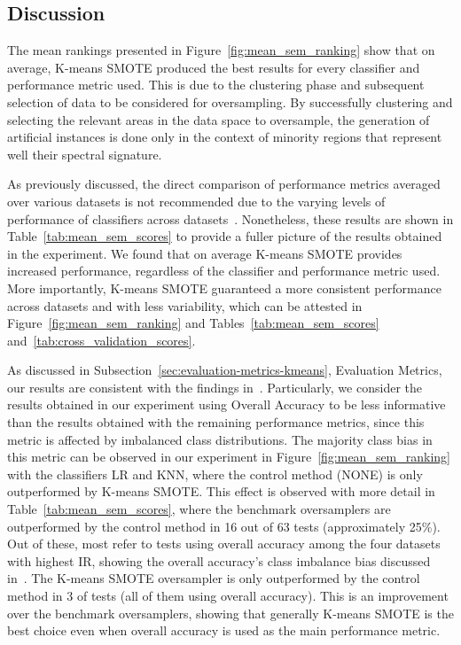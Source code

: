 \subsection{Discussion}

The mean rankings presented in
Figure~\ref{fig:mean_sem_ranking} show that on average,
K-means SMOTE produced the best results for every classifier and performance
metric used. This is due to the clustering phase and subsequent selection of
data to be considered for oversampling. By successfully clustering and
selecting the relevant areas in the data space to oversample, the generation
of artificial instances is done only in the context of minority regions that
represent well their spectral signature.

As previously discussed, the direct comparison of performance metrics averaged
over various datasets is not recommended due to the varying levels of
performance of classifiers across datasets~\cite{Demsar2006}. Nonetheless,
these results are shown in Table~\ref{tab:mean_sem_scores} to provide a fuller
picture of the results obtained in the experiment. We found that on average
K-means SMOTE provides increased performance, regardless of the classifier and
performance metric used. More importantly, K-means SMOTE guaranteed a more
consistent performance across datasets and with less variability, which can be
attested in Figure~\ref{fig:mean_sem_ranking} and
Tables~\ref{tab:mean_sem_scores} and~\ref{tab:cross_validation_scores}.

As discussed in Subsection~\ref{sec:evaluation-metrics-kmeans}, Evaluation Metrics,
our results are consistent with the findings in~\cite{Olofsson2013,
Pontius2011}. Particularly, we consider the results obtained in our experiment
using Overall Accuracy to be less informative than the results obtained with
the remaining performance metrics, since this metric is affected by imbalanced
class distributions. The majority class bias in this metric can be observed in
our experiment in Figure~\ref{fig:mean_sem_ranking} with the
classifiers LR and KNN, where the control method (NONE) is only outperformed
by K-means SMOTE. This effect is observed with more detail in
Table~\ref{tab:mean_sem_scores}, where the benchmark oversamplers are
outperformed by the control method in 16 out of 63 tests (approximately 25\%).
Out of these, most refer to tests using overall accuracy among the four
datasets with highest IR, showing the overall accuracy's class imbalance bias
discussed in~\cite{Olofsson2013, Pontius2011}. The K-means SMOTE oversampler
is only outperformed by the control method in 3 of tests (all of them using
overall accuracy). This is an improvement over the benchmark oversamplers,
showing that generally K-means SMOTE is the best choice even when overall
accuracy is used as the main performance metric.

